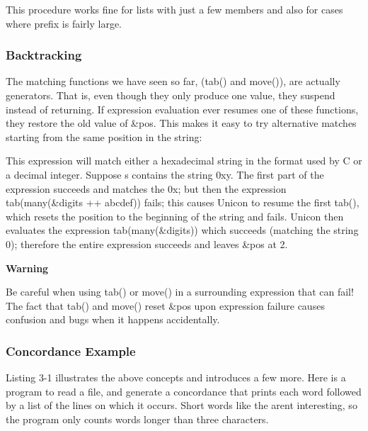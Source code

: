
This procedure works fine for lists with just a few members and also for
cases where \textsf{prefix} is fairly large.

\subsubsection[Backtracking]{Backtracking}
The matching functions we have seen so far,
(\textsf{tab()} and \textsf{move()}), are actually
generators. That is, even though they only produce one
value, they suspend instead of returning. If expression evaluation ever
resumes one of these functions, they restore the old value of
\textsf{\&pos}. This makes it easy to try alternative matches starting
from the same position in the string:


This expression will match either a hexadecimal string in the format
used by C or a decimal integer. Suppose \textsf{s} contains the string
\textsf{{\textquotedbl}0xy{\textquotedbl}}. The first part of the
expression succeeds and matches the
\textsf{{\textquotedbl}0x{\textquotedbl}}; but then the expression
\textsf{tab(many(\&digits ++
{\textquotesingle}abcdef{\textquotesingle}))} fails; this causes Unicon
to resume the first \textsf{tab()}, which resets the position to the
beginning of the string and fails. Unicon then evaluates the expression
\textsf{tab(many(\&digits))} which succeeds (matching the string
\textsf{{\textquotedbl}0{\textquotedbl}}); therefore the entire
expression succeeds and leaves \textsf{\&pos} at 2.

{\sffamily\bfseries
Warning}

{\sffamily
Be careful when using tab() or move() in a surrounding expression that
can fail! The fact that tab() and move() reset \&pos upon expression
failure causes confusion and bugs when it happens accidentally.}

\subsubsection{Concordance Example}
Listing 3-1 illustrates the above concepts and introduces a few more.
Here is a program to read a file, and generate a
concordance that prints each word followed by a list
of the lines on which it occurs. Short words like
\textsf{{\textquotedbl}the{\textquotedbl}} aren{\textquotesingle}t
interesting, so the program only counts words longer than three
characters. 

